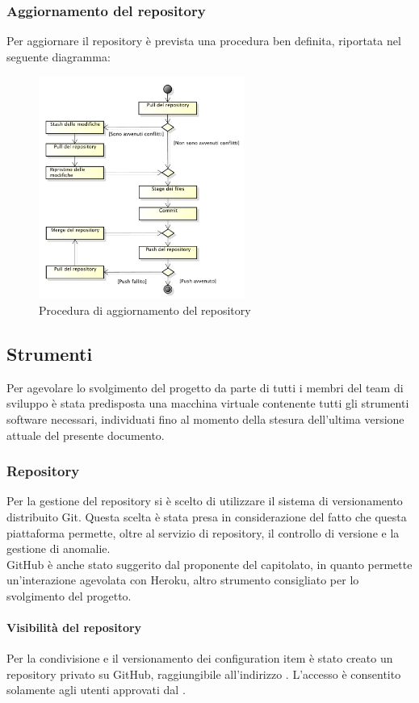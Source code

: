 		\subsubsection{Aggiornamento del repository}
				Per aggiornare il repository è prevista una procedura ben definita, riportata nel seguente diagramma:
				\begin{figure}[H]
					\centering
					\includegraphics[width=0.6\textwidth]{NormeDiProgetto/Pics/Commit}
					\caption{Procedura di aggiornamento del repository}
				\end{figure}
		
	\subsection{Strumenti}
		Per agevolare lo svolgimento del progetto da parte di tutti i membri del team di sviluppo è stata predisposta una macchina virtuale contenente tutti gli strumenti software necessari, individuati fino al momento della stesura dell'ultima versione attuale del presente documento.
		\subsubsection{Repository}
			Per la gestione del repository si è scelto di utilizzare il sistema di versionamento distribuito Git. Questa scelta è stata presa in considerazione del fatto che questa piattaforma permette, oltre al servizio di repository, il controllo di versione e la gestione di anomalie. \\
			GitHub è anche stato suggerito dal proponente del capitolato, in quanto permette un'interazione agevolata con Heroku, altro strumento consigliato per lo svolgimento del progetto. 
				\paragraph{Visibilità del repository}
				Per la condivisione e il versionamento dei configuration item è stato creato un repository privato su GitHub, raggiungibile all’indirizzo . L’accesso è consentito solamente agli utenti approvati dal .
				